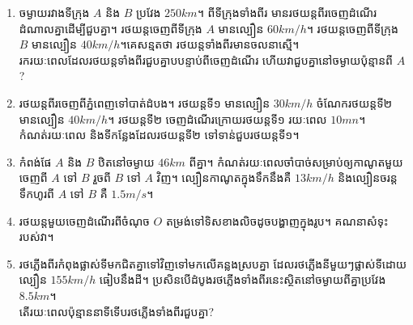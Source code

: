\begin{enumerate}
	\item ចម្ងាយរវាងទីក្រុង $A$ និង $B$ ប្រវែង $250km$។ ពីទីក្រុងទាំងពីរ មានរថយន្តពីរចេញដំណើរដំណាលគ្នាដើម្បីជួបគ្នា។ រថយន្តចេញពីទីក្រុង $A$ មានល្បឿន $60km/h$។ រថយន្តចេញពីទីក្រុង $B$ មានល្បឿន $40km/h$។គេសន្មតថា រថយន្តទាំងពីរមានចលនាស្មើ។\\ រករយៈពេលដែលរថយន្តទាំងពីរជួបគ្នាបបន្ទាប់ពីចេញដំណើរ ហើយវាជួបគ្នានៅចម្ងាយប៉ុន្មានពី $A$?
	\item រថយន្តពីរចេញពីភ្នំពេញទៅបាត់ដំបង។ រថយន្តទី១ មានល្បឿន $30km/h$ ចំណែករថយន្តទី២ មានល្បឿន $40km/h$។ រថយន្តទី២ ចេញដំណើរក្រោយរថយន្តទី១ រយៈពេល $10mn$។\\ កំណត់រយៈពេល និងទីកន្លែងដែលរថយន្តទី២ ទៅទាន់ជួបរថយន្តទី១។
	\item កំពង់ផែ $A$ និង $B$ ឋិតនៅចម្ងាយ $46km$ ពីគ្នា។ កំណត់រយៈពេលចាំបាច់សម្រាប់ឲ្យកាណូតមួយចេញពី $A$ ទៅ $B$ រួចពី $B$ ទៅ $A$ វិញ។ ល្បឿនកាណូតក្នុងទឹកនឹងគឺ $13km/h$ និងល្បឿនចរន្តទឹកហូរពី $A$ ទៅ $B$ គឺ $1.5m/s$។
	\item រថយន្តមួយចេញដំណើរពីចំណុច $O$ តម្រង់ទៅទិសខាងលិចដូចបង្ហាញក្នុងរូប។ គណនាសំទុះរបស់វា។
	\begin{figure}[H]
		\centering
	\end{figure}
	\item រថភ្លើងពីរកំពុងផ្លាស់ទីមកជិតគ្នាទៅវិញទៅមកលើគន្លងស្របគ្នា ដែលរថភ្លើងនីមួយៗផ្លាស់ទីដោយល្បឿន $155km/h$ ធៀបនឹងដី។ ប្រសិនបើដំបូងរថភ្លើងទាំងពីរនេះស្ថិតនៅចម្ងាយពីគ្នាប្រវែង $8.5km$។\\ តើរយៈពេលប៉ុន្មាននាទីទើបរថភ្លើងទាំងពីរជួបគ្នា?
	\begin{figure}[H]
		\centering
\end{figure}
\end{enumerate}
